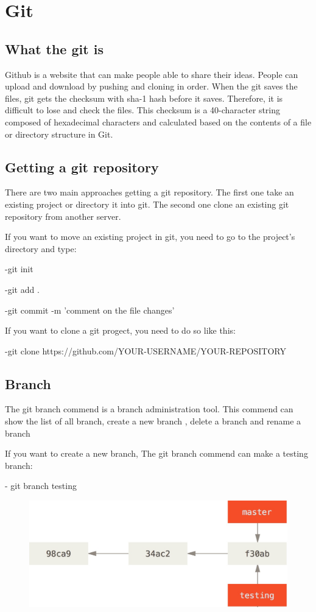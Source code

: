 \chapter{Git}
\section{What the git is}
Github is a website that can make people able to share their ideas. People can upload and download by pushing and cloning in order. When the git saves the files, git gets the checksum with sha-1 hash before it saves. Therefore, it is difficult to lose and check the files. This checksum is a 40-character string composed of hexadecimal characters and calculated based on the contents of a file or directory structure in Git.

\section{Getting a git repository}
There are two main approaches getting a git repository. The first one take an existing project or directory it into git. The second one clone an existing git repository from another server.

If you want to move an existing project in git, you need to go to the project's directory and type:
\vspace{0.1cm}

-git init 	

-git add .

-git commit -m 'comment on the file changes'

\vspace{0.1cm}
  If you want to clone a git progect, you need to do so like this:
  \vspace{0.1cm}

-git clone https://github.com/YOUR-USERNAME/YOUR-REPOSITORY

\section{Branch}
The git branch commend is a branch administration tool. This commend can show the list of all branch, create a new branch , delete a branch and rename a branch

  If you want to create a new branch, The git branch commend can make a testing branch:
  
  - git branch testing
 \begin{figure}
 \includegraphics[width=15cm]{hit.jpg}
 \end{figure}

